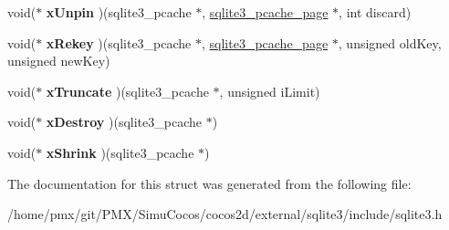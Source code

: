 \begin{DoxyCompactItemize}
void($\ast$ {\bfseries x\+Unpin} )(sqlite3\+\_\+pcache $\ast$, \hyperlink{structsqlite3__pcache__page}{sqlite3\+\_\+pcache\+\_\+page} $\ast$, int discard)
\item 
\mbox{\label{structsqlite3__pcache__methods2_a28a22927b108182e22025bbe6ba1f68e}} 
void($\ast$ {\bfseries x\+Rekey} )(sqlite3\+\_\+pcache $\ast$, \hyperlink{structsqlite3__pcache__page}{sqlite3\+\_\+pcache\+\_\+page} $\ast$, unsigned old\+Key, unsigned new\+Key)
\item 
\mbox{\label{structsqlite3__pcache__methods2_a7c565709ab91dbe7feb5b82c684ba604}} 
void($\ast$ {\bfseries x\+Truncate} )(sqlite3\+\_\+pcache $\ast$, unsigned i\+Limit)
\item 
\mbox{\label{structsqlite3__pcache__methods2_a144d6e899889e80e00f93fb6c83359e2}} 
void($\ast$ {\bfseries x\+Destroy} )(sqlite3\+\_\+pcache $\ast$)
\item 
\mbox{\label{structsqlite3__pcache__methods2_af00c121e9c39b1df292711013c226ba5}} 
void($\ast$ {\bfseries x\+Shrink} )(sqlite3\+\_\+pcache $\ast$)
\end{DoxyCompactItemize}


The documentation for this struct was generated from the following file\+:\begin{DoxyCompactItemize}
\item 
/home/pmx/git/\+P\+M\+X/\+Simu\+Cocos/cocos2d/external/sqlite3/include/sqlite3.\+h\end{DoxyCompactItemize}
